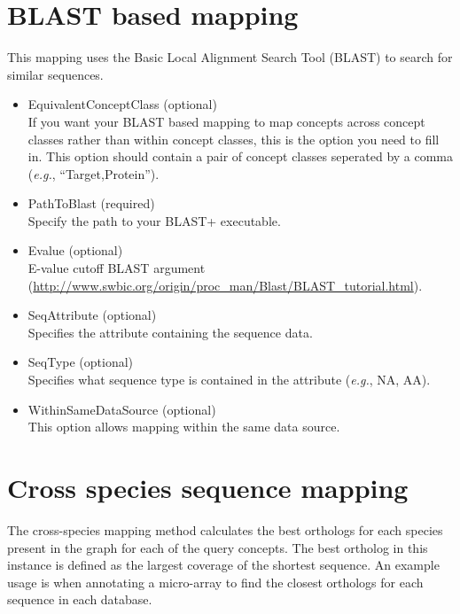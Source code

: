 \section{BLAST based mapping}
This mapping uses the Basic Local Alignment Search Tool (BLAST) to search for similar sequences.
\begin{itemize}
  
  \item{EquivalentConceptClass (optional)}\\
  If you want your BLAST based mapping to map concepts across concept classes rather than within concept classes, 
  this is the option you need to fill in.
  This option should contain a pair of concept classes seperated by a comma ({\it{e.g.}}, ``Target,Protein'').
  
  \item{PathToBlast (required)}\\
  Specify the path to your BLAST+ executable.
  
  \item{Evalue (optional)}\\
  E-value cutoff BLAST argument (\url{http://www.swbic.org/origin/proc_man/Blast/BLAST_tutorial.html}).
  
  \item{SeqAttribute (optional)}\\
  Specifies the attribute containing the sequence data.
  
  \item{SeqType (optional)}\\
  Specifies what sequence type is contained in the attribute ({\it{e.g.}}, NA, AA).
  
  \item{WithinSameDataSource (optional)}\\
  This option allows mapping within the same data source.
   
\end{itemize}


\section{Cross species sequence mapping}
The cross-species mapping method calculates the best orthologs for each species present in the graph for each of the query concepts.
The best ortholog in this instance is defined as the largest coverage of the shortest sequence.
An example usage is when annotating a micro-array to find the closest orthologs for each sequence in each database.

